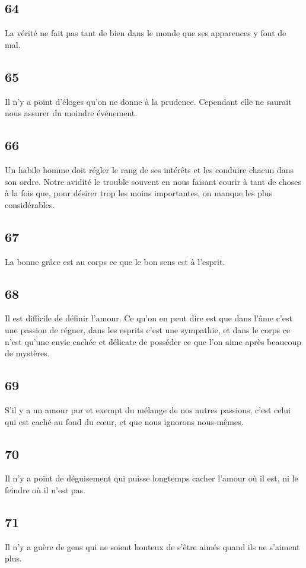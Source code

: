 \documentclass[french,twoside]{book} %
\begin{document}
\subsection[{64}]{ \textsc{64} }
\noindent La vérité ne fait pas tant de bien dans le monde que ses apparences y font de mal.
\subsection[{65}]{ \textsc{65} }
\noindent Il n’y a point d’éloges qu’on ne donne à la prudence. Cependant elle ne saurait nous assurer du moindre événement.
\subsection[{66}]{ \textsc{66} }
\label{\_GoBack}
\noindent Un habile homme doit régler le rang de ses intérêts et les conduire chacun dans son ordre. Notre avidité le trouble souvent en nous faisant courir à tant de choses à la fois que, pour désirer trop les moins importantes, on manque les plus considérables.
\subsection[{67}]{ \textsc{67} }
\noindent La bonne grâce est au corps ce que le bon sens est à l’esprit.
\subsection[{68}]{ \textsc{68} }
\noindent Il est difficile de définir l’amour. Ce qu’on en peut dire est que dans l’âme c’est une passion de régner, dans les esprits c’est une sympathie, et dans le corps ce n’est qu’une envie cachée et délicate de posséder ce que l’on aime après beaucoup de mystères.
\subsection[{69}]{ \textsc{69} }
\noindent S’il y a un amour pur et exempt du mélange de nos autres passions, c’est celui qui est caché au fond du cœur, et que nous ignorons nous-mêmes.
\subsection[{70}]{ \textsc{70} }
\noindent Il n’y a point de déguisement qui puisse longtemps cacher l’amour où il est, ni le feindre où il n’est pas.
\subsection[{71}]{ \textsc{71} }
\noindent Il n’y a guère de gens qui ne soient honteux de s’être aimés quand ils ne s’aiment plus.
\end{document}
